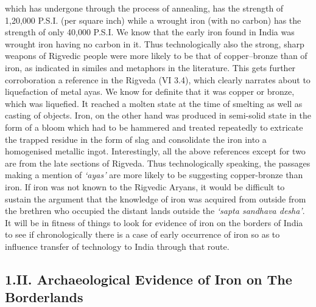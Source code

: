 which has undergone through the process of annealing, has the strength of 1,20,000 P.S.I. (per square inch) while a wrought iron (with no carbon) has the strength of only 40,000 P.S.I. We know that the early iron found in India was wrought iron having no carbon in it. Thus technologically also the strong, sharp weapons of Rigvedic people were more likely to be that of copper–bronze than of iron, as indicated in similes and metaphors in the literature. This gets further corroboration a reference in the Rigveda (VI 3.4), which clearly narrates about to liquefaction of metal ayas. We know for definite that it was copper or bronze, which was liquefied. It reached a molten state at the time of smelting as well as casting of objects. Iron, on the other hand was produced in semi-solid state in the form of a bloom which had to be hammered and treated repeatedly to extricate the trapped residue in the form of slag and consolidate the iron into a homogenised metallic ingot. Interestingly, all the above references except for two are from the late sections of Rigveda. Thus technologically speaking, the passages making a mention of \textit{‘ayas’} are more likely to be suggesting copper-bronze than iron. If iron was not known to the Rigvedic Aryans, it would be difficult to sustain the argument that the knowledge of iron was acquired from outside from the brethren who occupied the distant lands outside the \textit{‘sapta sandhava desha’}. It will be in fitness of things to look for evidence of iron on the borders of India to see if chronologically there is a case of early occurrence of iron so as to influence transfer of technology to India through that route. 

\subsection*{1.II. Archaeological Evidence of Iron on The Borderlands}\label{subsection-2}

